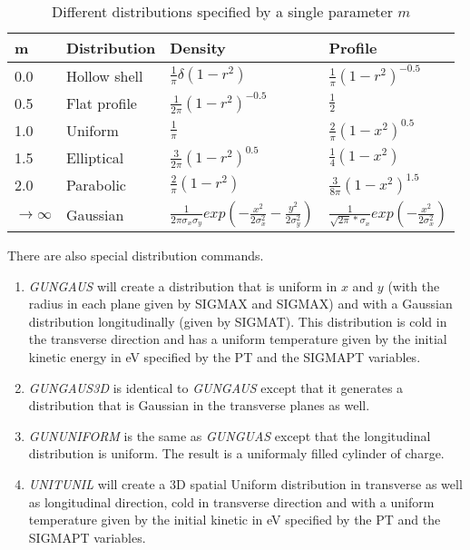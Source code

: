 \begin{table}[h!]
\begin{flushleft} \footnotesize
 \begin{tabular}{|l|l|l|l|}
\hline
\bf m & \bf Distribution & \bf Density & \bf Profile \\
\hline
0.0 & Hollow shell  & $\frac{1}{\pi}\delta(1-r^2)$ &$\frac{1}{\pi}(1-r^2)^{-0.5}$\\
\hline
0.5 & Flat profile  & $\frac{1}{2\pi}(1-r^2)^{-0.5}$ & $\frac{1}{2}$\\
\hline
1.0 & Uniform  & $\frac{1}{\pi}$ & $\frac{2}{\pi}(1-x^2)^{0.5}$\\
\hline
1.5 & Elliptical  & $\frac{3}{2\pi}(1-r^2)^{0.5}$ & $\frac{1}{4}(1-x^2)$ \\
\hline
2.0 & Parabolic  & $\frac{2}{\pi}(1-r^2)$ & $\frac{3}{8\pi}(1-x^2)^{1.5}$ \\
\hline
$\rightarrow \infty$ & Gaussian  & $\frac{1}{2\pi\sigma_x\sigma_y}exp(-\frac{x^2}{2\sigma_x^2} -\frac{y^2}{2\sigma_y^2})$ & 
                       $\frac{1}{\sqrt{2\pi}*\sigma_x}exp(-\frac{x^2}{2\sigma_x^2}) $ \\
\hline
\end{tabular}
\end{flushleft} 
\caption{\label{tab:binomdist}{Different distributions specified by a single parameter $m$}}
\end{table}
There are also special distribution commands.
\begin{enumerate}
\item {\it GUNGAUS} will create a distribution that is uniform in $x$ and $y$ (with the
radius in each plane given by SIGMAX and SIGMAX) and with a Gaussian distribution longitudinally (given by SIGMAT).
This distribution is cold in the transverse direction and has a uniform temperature given by the initial kinetic energy in
eV specified by the PT and the SIGMAPT variables.
\item {\it GUNGAUS3D} is identical to {\it GUNGAUS} except that it generates a distribution that is Gaussian in the
transverse planes as well.
\item {\it GUNUNIFORM} is the same as {\it GUNGUAS} except that the longitudinal distribution is uniform. The result is a
uniformaly filled cylinder of charge.
\item {\it UNITUNIL} will create a 3D spatial Uniform distribution in transverse as well as longitudinal direction, cold
in transverse direction and with a uniform temperature given by the initial kinetic in eV specified by the PT and the SIGMAPT variables.
\end{enumerate}


